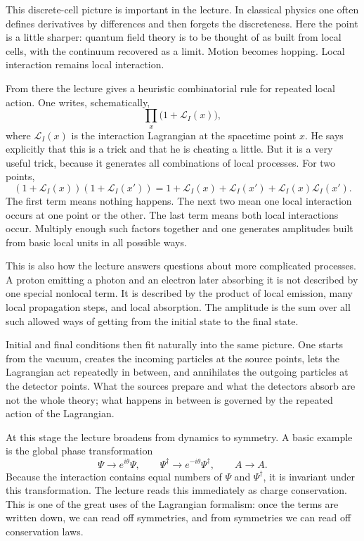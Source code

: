 This discrete-cell picture is important in the lecture. In classical physics one often defines derivatives by differences and then forgets the discreteness. Here the point is a little sharper: quantum field theory is to be thought of as built from local cells, with the continuum recovered as a limit. Motion becomes hopping. Local interaction remains local interaction.

From there the lecture gives a heuristic combinatorial rule for repeated local action. One writes, schematically,
\begin{equation}
\prod_x \bigl(1+\mathcal L_I(x)\bigr),
\end{equation}
where \(\mathcal L_I(x)\) is the interaction Lagrangian at the spacetime point \(x\). He says explicitly that this is a trick and that he is cheating a little. But it is a very useful trick, because it generates all combinations of local processes. For two points,
\begin{equation}
(1+\mathcal L_I(x))(1+\mathcal L_I(x'))
=
1+\mathcal L_I(x)+\mathcal L_I(x')+\mathcal L_I(x)\mathcal L_I(x').
\end{equation}
The first term means nothing happens. The next two mean one local interaction occurs at one point or the other. The last term means both local interactions occur. Multiply enough such factors together and one generates amplitudes built from basic local units in all possible ways.

This is also how the lecture answers questions about more complicated processes. A proton emitting a photon and an electron later absorbing it is not described by one special nonlocal term. It is described by the product of local emission, many local propagation steps, and local absorption. The amplitude is the sum over all such allowed ways of getting from the initial state to the final state.

Initial and final conditions then fit naturally into the same picture. One starts from the vacuum, creates the incoming particles at the source points, lets the Lagrangian act repeatedly in between, and annihilates the outgoing particles at the detector points. What the sources prepare and what the detectors absorb are not the whole theory; what happens in between is governed by the repeated action of the Lagrangian.

At this stage the lecture broadens from dynamics to symmetry. A basic example is the global phase transformation
\begin{equation}
\Psi \to e^{i\theta}\Psi,
\qquad
\Psi^\dagger \to e^{-i\theta}\Psi^\dagger,
\qquad
A \to A.
\end{equation}
Because the interaction contains equal numbers of \(\Psi\) and \(\Psi^\dagger\), it is invariant under this transformation. The lecture reads this immediately as charge conservation. This is one of the great uses of the Lagrangian formalism: once the terms are written down, we can read off symmetries, and from symmetries we can read off conservation laws.


